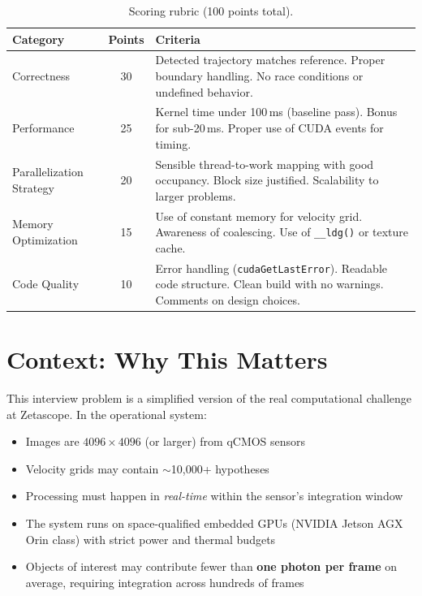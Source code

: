 \documentclass[11pt,letterpaper]{article}
\begin{document}
\begin{table}[h]
\centering
\caption{Scoring rubric (100 points total).}
\label{tab:rubric}
\begin{tabular}{@{}p{4.5cm}cp{7.5cm}@{}}
\toprule
\textbf{Category} & \textbf{Points} & \textbf{Criteria} \\
\midrule
Correctness &
30 &
Detected trajectory matches reference. Proper boundary handling.
No race conditions or undefined behavior. \\
\addlinespace
Performance &
25 &
Kernel time under 100\,ms (baseline pass). Bonus for sub-20\,ms.
Proper use of CUDA events for timing. \\
\addlinespace
Parallelization Strategy &
20 &
Sensible thread-to-work mapping with good occupancy. Block size
justified. Scalability to larger problems. \\
\addlinespace
Memory Optimization &
15 &
Use of constant memory for velocity grid. Awareness of coalescing.
Use of \texttt{\_\_ldg()} or texture cache. \\
\addlinespace
Code Quality &
10 &
Error handling (\texttt{cudaGetLastError}). Readable code structure.
Clean build with no warnings. Comments on design choices. \\
\bottomrule
\end{tabular}
\end{table}

\section{Context: Why This Matters}
\label{sec:context}

This interview problem is a simplified version of the real computational
challenge at Zetascope. In the operational system:

\begin{itemize}[leftmargin=2em]
    \item Images are $4096 \times 4096$ (or larger) from qCMOS sensors
    \item Velocity grids may contain $\sim$10{,}000+ hypotheses
    \item Processing must happen in \emph{real-time} within the sensor's
          integration window
    \item The system runs on space-qualified embedded GPUs
          (NVIDIA Jetson AGX Orin class) with strict power and thermal budgets
    \item Objects of interest may contribute fewer than \textbf{one photon
          per frame} on average, requiring integration across hundreds of frames
\end{itemize}
\end{document}

